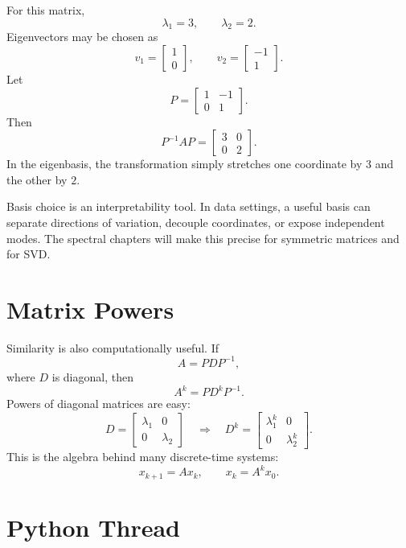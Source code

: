For this matrix,
\[
  \lambda_1=3,\qquad \lambda_2=2.
\]
Eigenvectors may be chosen as
\[
  v_1=\begin{bmatrix}1\\0\end{bmatrix},
  \qquad
  v_2=\begin{bmatrix}-1\\1\end{bmatrix}.
\]
Let
\[
  P=\begin{bmatrix}1&-1\\0&1\end{bmatrix}.
\]
Then
\[
  P^{-1}AP=
  \begin{bmatrix}
  3&0\\
  0&2
  \end{bmatrix}.
\]
In the eigenbasis, the transformation simply stretches one coordinate by $3$
and the other by $2$.

\begin{aimlbox}
Basis choice is an interpretability tool. In data settings, a useful basis can
separate directions of variation, decouple coordinates, or expose independent
modes. The spectral chapters will make this precise for symmetric matrices and
for SVD.
\end{aimlbox}

\section{Matrix Powers}

Similarity is also computationally useful. If
\[
  A=PDP^{-1},
\]
where $D$ is diagonal, then
\[
  A^k = PD^kP^{-1}.
\]
Powers of diagonal matrices are easy:
\[
  D=
  \begin{bmatrix}
  \lambda_1&0\\
  0&\lambda_2
  \end{bmatrix}
  \quad\Longrightarrow\quad
  D^k=
  \begin{bmatrix}
  \lambda_1^k&0\\
  0&\lambda_2^k
  \end{bmatrix}.
\]
This is the algebra behind many discrete-time systems:
\[
  x_{k+1}=Ax_k,\qquad x_k=A^kx_0.
\]

\section{Python Thread}

